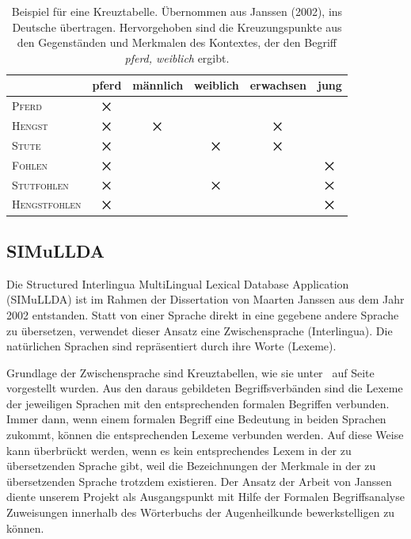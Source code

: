\documentclass[pagesize,paper=A4,DIV=calc,fontsize=12pt,draft=false]{scrreprt}
\newcommand*{\bigtimes}{\mathop{\raisebox{-.15ex}{\hbox{\Large{$\times$}}}}}
\begin{document}
\begin{table}[h!]
\centering
\renewcommand{\arraystretch}{2}
\begin{tabular}{l|C|c|C|c|c}
&	pferd &	männlich &	weiblich &	erwachsen &	jung\\
\hline
\textsc{Pferd}	&	$\bigtimes$	&&&&\\
\hline
\textsc{Hengst}	&	$\bigtimes$	&	$\bigtimes$	&&	$\bigtimes$	&\\
\hline
{}
\textsc{Stute}	&	\color{white}$\bigtimes$	&&	\color{white}$\bigtimes$	&	$\bigtimes$	&\\
\hline
\textsc{Fohlen}	&	$\bigtimes$	&&&&	$\bigtimes$\\
\hline
{}
\textsc{Stutfohlen}	&	\color{white}$\bigtimes$	&&	\color{white}$\bigtimes$	&&	$\bigtimes$\\
\hline
\textsc{Hengstfohlen}	&	$\bigtimes$	&	&&&	$\bigtimes$
\end{tabular}
\caption{Beispiel für eine Kreuztabelle. Übernommen aus Janssen (2002), ins Deutsche übertragen. Hervorgehoben sind die Kreuzungspunkte aus den Gegenständen und Merkmalen des Kontextes, der den Begriff \emph{pferd, weiblich} ergibt.}
\label{tab:janssen}
\end{table}

\subsection{SIMuLLDA}

Die Structured Interlingua MultiLingual Lexical Database Application (SIMuLLDA) ist im Rahmen der Dissertation von Maarten Janssen aus dem Jahr 2002 entstanden. 
Statt von einer Sprache direkt in eine gegebene andere Sprache zu übersetzen, verwendet dieser Ansatz eine Zwischensprache (Interlingua). 
Die natürlichen Sprachen sind repräsentiert durch ihre Worte (Lexeme). 

Grundlage der Zwischensprache sind Kreuztabellen, wie sie unter\emph{~} auf Seite~\pageref{subsec:fba} vorgestellt wurden. 
Aus den daraus gebildeten Begriffsverbänden sind die Lexeme der jeweiligen Sprachen mit den entsprechenden formalen Begriffen verbunden. 
Immer dann, wenn einem formalen Begriff eine Bedeutung in beiden Sprachen zukommt, können die entsprechenden Lexeme verbunden werden. 
Auf diese Weise kann überbrückt werden, wenn es kein entsprechendes Lexem in der zu übersetzenden Sprache gibt, weil die Bezeichnungen der Merkmale in der zu übersetzenden Sprache trotzdem existieren. 
Der Ansatz der Arbeit von Janssen diente unserem Projekt als Ausgangspunkt mit Hilfe der Formalen Begriffsanalyse Zuweisungen innerhalb des Wörterbuchs der Augenheilkunde bewerkstelligen zu können. 
\end{document}
